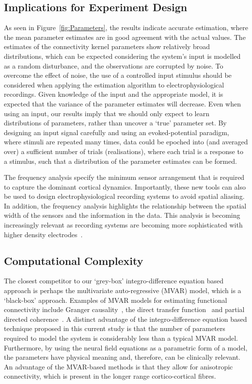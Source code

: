 \documentclass[10pt]{article}
\begin{document}
\subsection*{Implications for Experiment Design}
As seen in Figure~\ref{fig:Parameters}, the results indicate accurate estimation, where the mean parameter estimates are in good agreement with the actual values. The estimates of the connectivity kernel parameters show relatively broad distributions, which can be expected considering the system's input is modelled as a random disturbance, and the observations are corrupted by noise. To overcome the effect of noise, the use of a controlled input stimulus should be considered when applying the estimation algorithm to electrophysiological recordings. Given knowledge of the input and the appropriate model, it is expected that the variance of the parameter estimates will decrease. Even when using an input, our results imply that we should only expect to learn distributions of parameters, rather than uncover a `true' parameter set. By designing an input signal carefully and using an evoked-potential paradigm, where stimuli are repeated many times, data could be epoched into (and averaged over) a sufficient number of trials (realisations), where each trial is a response to a stimulus, such that a distribution of the parameter estimates can be formed.

The frequency analysis specify the minimum sensor arrangement that is required to capture the dominant cortical dynamics. Importantly, these new tools can also be used to design electrophysiological recording systems to avoid spatial aliasing. In addition, the frequency analysis highlights the relationship between the spatial width of the sensors and the information in the data. This analysis is becoming increasingly relevant as recording systems are becoming more sophisticated with higher density electrodes~\cite{Brinkmann2009}.

\subsection*{Computational Complexity}
The closest competitor to our `grey-box' integro-difference equation based approach is perhaps the multivariate auto-regressive (MVAR) model, which is a `black-box' approach. Examples of MVAR models for estimating functional connectivity include Granger causality~\cite{Hesse2003}, the direct transfer function~\cite{Kaminski1991} and partial directed coherence~\cite{Sameshima1999}. A distinct advantage of the integro-difference equation based technique proposed in this current study is that the number of parameters required to model the system is considerably less than a typical MVAR model. Furthermore, by using the neural field equations as a parametric form of a model, the parameters have physical meaning and, therefore, can be clinically relevant. An advantage of the MVAR-based methods is that they allow for anisotropic connectivity, which is present in the longer range cortico-cortical fibres. 
\end{document}
